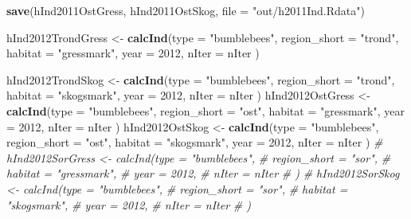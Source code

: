 \documentclass[]{article}
\newenvironment{Shaded}{\begin{snugshade}}{\end{snugshade}}
\newcommand{\KeywordTok}[1]{\textcolor[rgb]{0.13,0.29,0.53}{\textbf{#1}}}
\newcommand{\DataTypeTok}[1]{\textcolor[rgb]{0.13,0.29,0.53}{#1}}
\newcommand{\DecValTok}[1]{\textcolor[rgb]{0.00,0.00,0.81}{#1}}
\newcommand{\StringTok}[1]{\textcolor[rgb]{0.31,0.60,0.02}{#1}}
\newcommand{\CommentTok}[1]{\textcolor[rgb]{0.56,0.35,0.01}{\textit{#1}}}
\newcommand{\NormalTok}[1]{#1}
\begin{document}
\begin{Shaded}
\begin{Highlighting}[]
\KeywordTok{save}\NormalTok{(hInd2011OstGress, hInd2011OstSkog, }\DataTypeTok{file =} \StringTok{"out/h2011Ind.Rdata"}\NormalTok{)}
\end{Highlighting}
\end{Shaded}

\begin{Shaded}
\begin{Highlighting}[]
\NormalTok{hInd2012TrondGress <-}\StringTok{ }\KeywordTok{calcInd}\NormalTok{(}\DataTypeTok{type =} \StringTok{"bumblebees"}\NormalTok{,}
                              \DataTypeTok{region_short =} \StringTok{"trond"}\NormalTok{,}
                              \DataTypeTok{habitat =} \StringTok{"gressmark"}\NormalTok{,}
                              \DataTypeTok{year =} \DecValTok{2012}\NormalTok{,}
                              \DataTypeTok{nIter =}\NormalTok{ nIter}
\NormalTok{                              )}
       
\NormalTok{hInd2012TrondSkog <-}\StringTok{ }\KeywordTok{calcInd}\NormalTok{(}\DataTypeTok{type =} \StringTok{"bumblebees"}\NormalTok{,}
                              \DataTypeTok{region_short =} \StringTok{"trond"}\NormalTok{,}
                              \DataTypeTok{habitat =} \StringTok{"skogsmark"}\NormalTok{,}
                              \DataTypeTok{year =} \DecValTok{2012}\NormalTok{,}
                              \DataTypeTok{nIter =}\NormalTok{ nIter}
\NormalTok{                              )}
\NormalTok{hInd2012OstGress <-}\StringTok{ }\KeywordTok{calcInd}\NormalTok{(}\DataTypeTok{type =} \StringTok{"bumblebees"}\NormalTok{,}
                              \DataTypeTok{region_short =} \StringTok{"ost"}\NormalTok{,}
                              \DataTypeTok{habitat =} \StringTok{"gressmark"}\NormalTok{,}
                              \DataTypeTok{year =} \DecValTok{2012}\NormalTok{,}
                              \DataTypeTok{nIter =}\NormalTok{ nIter}
\NormalTok{                              )}
\NormalTok{hInd2012OstSkog <-}\StringTok{ }\KeywordTok{calcInd}\NormalTok{(}\DataTypeTok{type =} \StringTok{"bumblebees"}\NormalTok{,}
                              \DataTypeTok{region_short =} \StringTok{"ost"}\NormalTok{,}
                              \DataTypeTok{habitat =} \StringTok{"skogsmark"}\NormalTok{,}
                              \DataTypeTok{year =} \DecValTok{2012}\NormalTok{,}
                              \DataTypeTok{nIter =}\NormalTok{ nIter}
\NormalTok{                              )}
\CommentTok{# hInd2012SorGress <- calcInd(type = "bumblebees",}
\CommentTok{#                               region_short = "sor",}
\CommentTok{#                               habitat = "gressmark",}
\CommentTok{#                               year = 2012,}
\CommentTok{#                               nIter = nIter}
\CommentTok{#                               )}
\CommentTok{# hInd2012SorSkog <- calcInd(type = "bumblebees",}
\CommentTok{#                               region_short = "sor",}
\CommentTok{#                               habitat = "skogsmark",}
\CommentTok{#                               year = 2012,}
\CommentTok{#                               nIter = nIter}
\CommentTok{#                               )}


\end{Highlighting}
\end{Shaded}
\end{document}
